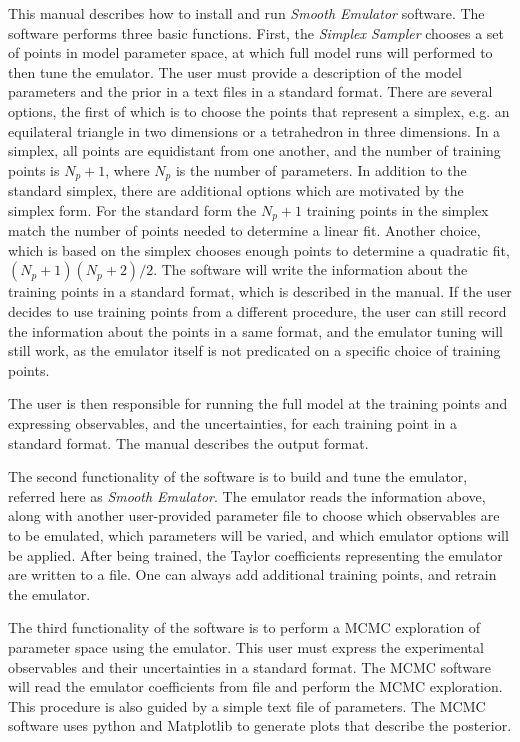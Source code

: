 \documentclass[12pt]{article}
\numberwithin{equation}{section}
\numberwithin{figure}{section}
\begin{document}
This manual describes how to install and run {\it Smooth Emulator} software. The software performs three basic functions. First, the {\it {\it Simplex Sampler}} chooses a set of points in model parameter space, at which full model runs will performed to then tune the emulator. The user must provide a description of the model parameters and the prior in a text files in a standard format. There are several options, the first of which is to choose the points that represent a simplex, e.g. an equilateral triangle in two dimensions or a tetrahedron in three dimensions. In a simplex, all points are equidistant from one another, and the number of training points is $N_p+1$, where $N_p$ is the number of parameters. In addition to the standard simplex, there are additional options which are motivated by the simplex form. For the standard form the  $N_p+1$ training points in the simplex match the number of points needed to determine a linear fit. Another choice, which is based on the simplex chooses enough points to determine a quadratic fit, $(N_p+1)(N_p+2)/2$. The software will write the information about the training points in a standard format, which is described in the manual. If the user decides to use training points from a different procedure, the user can still record the information about the points in a same format, and the emulator tuning will still work, as the emulator itself is not predicated on a specific choice of training points.

 The user is then responsible for running the full model at the training points and expressing observables, and the uncertainties, for each training point in a standard format. The manual describes the output format.

 The second functionality of the software is to build and tune the emulator, referred here as {\it {\it Smooth Emulator}}. The emulator reads the information above, along with another user-provided parameter file to choose which observables are to be emulated, which parameters will be varied, and which emulator options will be applied. After being trained, the Taylor coefficients representing the emulator are written to a file. One can always add additional training points, and retrain the emulator. 

The third functionality of the software is to perform a MCMC exploration of parameter space using the emulator. This user must express the experimental observables and their uncertainties in a standard format. The MCMC software will read the emulator coefficients from file and perform the MCMC exploration. This procedure is also guided by a simple text file of parameters. The MCMC software uses python and Matplotlib to generate plots that describe the posterior. 


\newpage



\newpage



\newpage



\newpage



\newpage



\newpage



\newpage



\newpage


\end{document}
